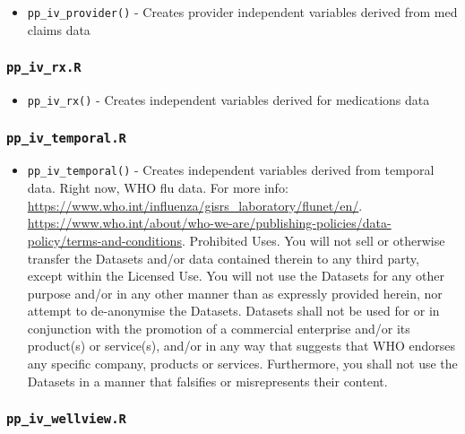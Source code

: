 \documentclass[
]{book}
\providecommand{\tightlist}{%
  \setlength{\itemsep}{0pt}\setlength{\parskip}{0pt}}
\begin{document}
\begin{itemize}
\tightlist
\item
  \texttt{pp\_iv\_provider()} - Creates provider independent variables derived from med claims data
\end{itemize}

\hypertarget{pp_iv_rx.r}{%
\subsubsection{\texorpdfstring{\texttt{pp\_iv\_rx.R}}{pp\_iv\_rx.R}}\label{pp_iv_rx.r}}

\begin{itemize}
\tightlist
\item
  \texttt{pp\_iv\_rx()} - Creates independent variables derived for medications data
\end{itemize}

\hypertarget{pp_iv_temporal.r}{%
\subsubsection{\texorpdfstring{\texttt{pp\_iv\_temporal.R}}{pp\_iv\_temporal.R}}\label{pp_iv_temporal.r}}

\begin{itemize}
\tightlist
\item
  \texttt{pp\_iv\_temporal()} - Creates independent variables derived from temporal data. Right now, WHO flu data. For more info: \url{https://www.who.int/influenza/gisrs_laboratory/flunet/en/}. \url{https://www.who.int/about/who-we-are/publishing-policies/data-policy/terms-and-conditions}. Prohibited Uses. You will not sell or otherwise transfer the Datasets and/or data contained therein to any third party, except within the Licensed Use. You will not use the Datasets for any other purpose and/or in any other manner than as expressly provided herein, nor attempt to de-anonymise the Datasets. Datasets shall not be used for or in conjunction with the promotion of a commercial enterprise and/or its product(s) or service(s), and/or in any way that suggests that WHO endorses any specific company, products or services. Furthermore, you shall not use the Datasets in a manner that falsifies or misrepresents their content.
\end{itemize}

\hypertarget{pp_iv_wellview.r}{%
\subsubsection{\texorpdfstring{\texttt{pp\_iv\_wellview.R}}{pp\_iv\_wellview.R}}\label{pp_iv_wellview.r}}
\end{document}
